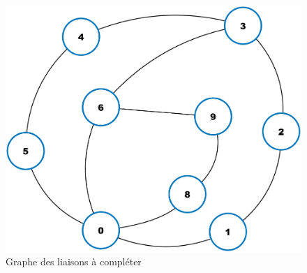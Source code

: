 









\begin{figure}[!h]
 \centering\includegraphics[width=0.4\linewidth]{img/graphe_liaisons}
 \caption{Graphe des liaisons à compléter}
 \label{imggraphe}
\end{figure}










\newpage


